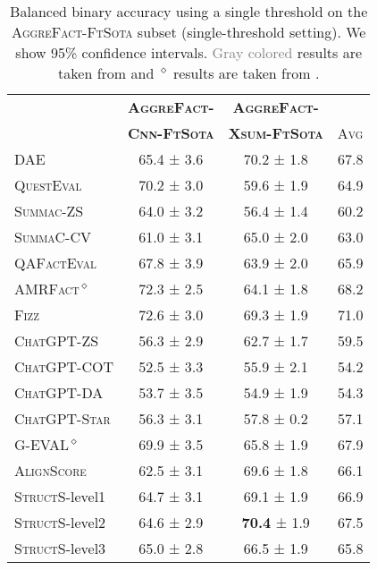 \begin{table}[t!]
\scriptsize
\centering
\begin{NiceTabular}{lcc|r}
 \toprule
& \textbf{\textsc{AggreFact-}} & \textbf{\textsc{AggreFact-}}\\
& \textbf{\textsc{Cnn-FtSota}} & \textbf{\textsc{Xsum-FtSota}} & \textsc{Avg}\\
\midrule
\RowStyle{\color{gray}}
 DAE    & 65.4 ± 3.6 & 70.2 ± 1.8 & 67.8\\
 \RowStyle{\color{gray}}
 \textsc{QuestEval}    &70.2 ± 3.0 & 59.6 ± 1.9 & 64.9\\
 \RowStyle{\color{gray}}
\textsc{Summac-ZS}    &    64.0 ± 3.2 & 56.4 ± 1.4 & 60.2\\
\RowStyle{\color{gray}}
\textsc{SummaC-CV}      &61.0 ± 3.1 & 65.0 ± 2.0 & 63.0\\
\RowStyle{\color{gray}}
 \textsc{QAFactEval}     &  67.8 ± 3.9 &  63.9 ± 2.0 & 65.9\\
      
 \textsc{AMRFact}\textsuperscript{{$\diamond$}} & 72.3 ± 2.5 & 64.1 ± 1.8 &  68.2 \\
  \textsc{Fizz} & 72.6 ± 3.0 &69.3 ± 1.9  & 71.0 \\
\midrule
\RowStyle{\color{gray}}
\textsc{ChatGPT-ZS} & 56.3 ± 2.9 & 62.7 ± 1.7 & 59.5 \\
\RowStyle{\color{gray}}
\textsc{ChatGPT-COT}&  52.5 ± 3.3 &  55.9 ± 2.1 & 54.2\\
\RowStyle{\color{gray}}
\textsc{ChatGPT-DA}& 53.7 ± 3.5 & 54.9 ± 1.9 & 54.3  \\
\RowStyle{\color{gray}}
\textsc{ChatGPT-Star} & 56.3 ± 3.1&  57.8 ± 0.2  & 57.1\\
G-EVAL\textsuperscript{$\diamond$} & 69.9 ± 3.5 & 65.8 ± 1.9 & 67.9\\
\midrule 
  \textsc{AlignScore}       & 62.5 ± 3.1  &  69.6 ± 1.8 & 66.1\\
\textsc{StructS}-level1 & 64.7 ± 3.1 & 69.1 ± 1.9 & 66.9 \\
\textsc{StructS}-level2 & 64.6 ± 2.9 &  \textbf{70.4} ± 1.9 & 67.5\\
\textsc{StructS}-level3 & 65.0 ± 2.8 & 66.5 ± 1.9 & 65.8\\

\midrule
\end{NiceTabular}
\caption{ Balanced binary accuracy using a single threshold on the \textsc{AggreFact-FtSota}  subset (single-threshold setting). We show 95\% confidence intervals. \textcolor{gray}{Gray colored}  results are taken from \cite{tang-etal-2023-understanding} and \textsuperscript{$\diamond$} results are taken from \cite{qiu2023amrfact}.}\label{tab:aggrefact_blacc_resul}
\end{table}